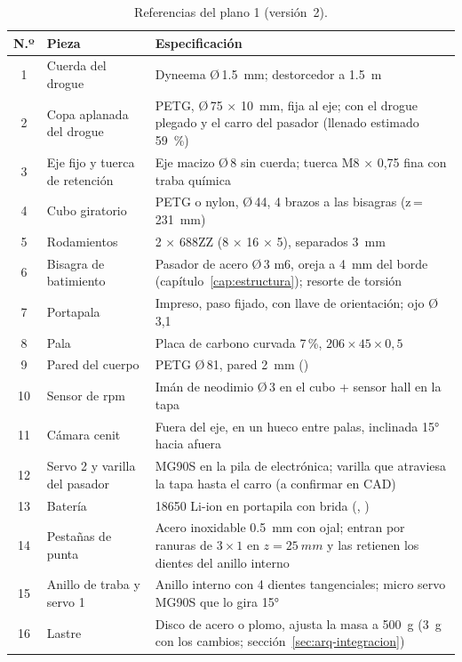 \begin{table}[H]
\centering\small
\caption{Referencias del plano 1 (versión~2).}\label{tab:ref-p1}
\begin{tabularx}{\textwidth}{@{}clY@{}}
\toprule
\textbf{N.º} & \textbf{Pieza} & \textbf{Especificación}\\ & Cuerda del drogue & Dyneema Ø\,\SI{1.5}{mm}; destorcedor a \SI{1.5}{m}\\
2 & Copa aplanada del drogue & PETG, Ø\,75 $\times$ \SI{10}{mm}, fija al eje; con el drogue plegado y el carro del pasador (llenado estimado \SI{59}{\percent})\\
3 & Eje fijo y tuerca de retención & Eje macizo Ø\,8 sin cuerda; tuerca M8 × 0,75 fina con traba química\\
4 & Cubo giratorio & PETG o nylon, Ø\,44, 4 brazos a las bisagras (z\,=\,\SI{231}{mm})\\
5 & Rodamientos & 2 × 688ZZ (8 × 16 × 5), separados \SI{3}{mm}\\
6 & Bisagra de batimiento & Pasador de acero Ø\,3 m6, oreja a \SI{4}{mm} del borde (capítulo~\ref{cap:estructura}); resorte de torsión\\
7 & Portapala & Impreso, paso fijado, con llave de orientación; ojo Ø\,3,1\\
8 & Pala & Placa de carbono curvada 7\,\%, $206\times45\times0{,}5$\\
9 & Pared del cuerpo & PETG Ø\,81, pared \SI{2}{mm} ()\\
10 & Sensor de rpm & Imán de neodimio Ø\,3 en el cubo + sensor hall en la tapa\\
11 & Cámara cenit & Fuera del eje, en un hueco entre palas, inclinada \ang{15} hacia afuera\\
12 & Servo 2 y varilla del pasador & MG90S en la pila de electrónica; varilla que atraviesa la tapa hasta el carro (a confirmar en CAD)\\
13 & Batería & 18650 Li-ion en portapila con brida (, )\\
14 & Pestañas de punta & Acero inoxidable \SI{0.5}{mm} con ojal; entran por ranuras de $3\times1$ en $z=\SI{25}{mm}$ y las retienen los dientes del anillo interno\\
15 & Anillo de traba y servo 1 & Anillo interno con 4 dientes tangenciales; micro servo MG90S que lo gira \ang{15}\\
16 & Lastre & Disco de acero o plomo, ajusta la masa a \SI{500}{g} (\SI{3}{g} con los cambios; sección~\ref{sec:arq-integracion})\\

\end{tabularx}
\end{table}
